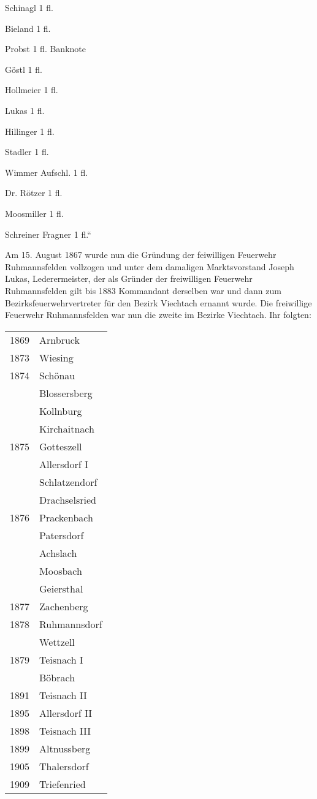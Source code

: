 \documentclass[12pt,a4paper]{book}
\begin{document}
\begin{compactitem}
\item Schinagl 1 fl.
\item Bieland 1 fl.
\item Probst 1 fl. Banknote
\item Göstl 1 fl.
\item Hollmeier 1 fl.
\item Lukas 1 fl.
\item Hillinger 1 fl.
\item Stadler 1 fl.
\item Wimmer Aufschl. 1 fl.
\item Dr. Rötzer 1 fl.
\item Moosmiller 1 fl.
\item Schreiner Fragner 1 fl.“
\end{compactitem}

Am 15. August 1867 wurde nun die Gründung der feiwilligen Feuerwehr
Ruhmannsfelden vollzogen und unter dem damaligen Marktsvorstand Joseph Lukas,
Lederermeister, der als Gründer der freiwilligen Feuerwehr Ruhmannsfelden gilt
bis 1883 Kommandant derselben war und dann zum Bezirksfeuerwehrvertreter für den
Bezirk Viechtach ernannt wurde. Die freiwillige Feuerwehr Ruhmannsfelden war nun
die zweite im Bezirke Viechtach. Ihr folgten:

\begin{tabular}{ll}
1869 & Arnbruck\\
1873 & Wiesing\\
1874 & Schönau\\
& Blossersberg\\
& Kollnburg\\
& Kirchaitnach\\
1875 & Gotteszell\\
& Allersdorf I\\
& Schlatzendorf\\
& Drachselsried\\
1876 & Prackenbach\\
& Patersdorf\\
& Achslach\\
& Moosbach\\
& Geiersthal\\
1877 & Zachenberg\\
1878 & Ruhmannsdorf\\
& Wettzell\\
1879 & Teisnach I\\
& Böbrach\\
1891 & Teisnach II\\
1895 & Allersdorf II\\
1898 & Teisnach III\\
1899 & Altnussberg\\
1905 & Thalersdorf\\
1909 & Triefenried\\
\end{tabular}
\end{document}
